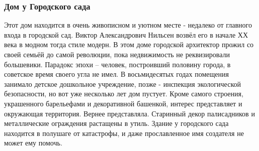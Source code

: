  
 
 
 
 

\subsubsection{Дом у Городского сада}

Этот дом находится в очень живописном и уютном месте - недалеко от главного
входа в городской сад. Виктор Александрович Нильсен возвёл его в начале ХХ века
в модном тогда стиле модерн. В этом доме городской архитектор прожил со своей
семьёй до самой революции, пока недвижимость не реквизировали большевики.
Парадокс эпохи – человек, построивший половину города, в советское время своего
угла не имел. В восьмидесятых годах помещения занимало детское дошкольное
учреждение, позже - инспекция экологической безопасности, но вот уже несколько
лет дом пустует. Кроме самого строения, украшенного барельефами и декоративной
башенкой, интерес представляет и окружающая территория. Вернее представляла.
Старинный декор палисадников и металлические ограждения растащены в утиль.
Здание у городского сада находится в полушаге от катастрофы, и даже
прославленное имя создателя не может ему помочь.

